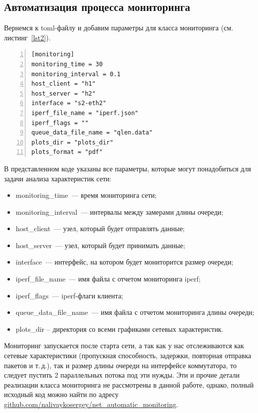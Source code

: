 \documentclass[60x84/16,8pt]{ittmm}
\begin{document}
\subsection{Автоматизация процесса мониторинга}

Вернемся к toml-файлу и добавим параметры для класса мониторинга
(см. листинг~\ref{lst2}).

\begin{lstlisting}[breaklines=true, numbers=left,
  basicstyle=\ttfamily\small, xleftmargin=\parindent, caption={Пример  toml-файла с
    описанием мониторинга сетевых характеристик}, label=lst2]
[monitoring]
monitoring_time = 30
monitoring_interval = 0.1
host_client = "h1"
host_server = "h2"
interface = "s2-eth2"
iperf_file_name = "iperf.json"
iperf_flags = ""
queue_data_file_name = "qlen.data"
plots_dir = "plots_dir"
plots_format = "pdf"
\end{lstlisting}


В представленном коде указаны все параметры, которые могут
понадобиться для задачи анализа характеристик сети:
\begin{itemize}
\item monitoring\_time~--- время мониторинга сети;
\item monitoring\_interval~--- интервалы между замерами длины очереди;
\item host\_client~--- узел, который будет отправлять данные;
\item host\_server~--- узел, который будет принимать данные;
\item interface~--- интерфейс, на котором будет мониторится размер
  очереди;
\item iperf\_file\_name~--- имя файла с отчетом мониторинга iperf;
\item iperf\_flags~--- iperf-флаги клиента;
\item queue\_data\_file\_name~--- имя файла с отчетом мониторинга длины
  очереди;
\item plots\_dir -- директория со всеми графиками сетевых
  характеристик.
\end{itemize}


Мониторинг запускается после старта сети, а так как у нас
отслеживаются как сетевые характеристики (пропускная способность,
задержки, повторная отправка пакетов и т.\,д.), так и размер длины
очереди на интерфейсе коммутатора, то следует пустить 2 параллельных
потока под эти нужды. Эти и прочие детали реализации класса
мониторинга не рассмотрены в данной работе, однако, полный исходный
код можно найти по адресу
\href{https://github.com/nalivaykosergey/net_automatic_monitoring}{github.com/nalivaykosergey/net\_automatic\_monitoring}.
\end{document}
